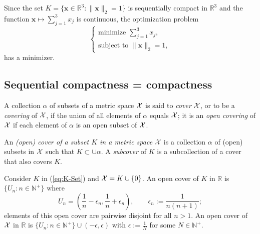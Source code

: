 \begin{exm}
  Since the set $K=\{\mathbf{x}\in \mathbb{R}^3: \|\mathbf{x}\|_2=1\}$
  is sequentially compact in $\mathbb{R}^3$ and the function
  $\mathbf{x}\mapsto \sum_{j=1}^3x_j$ is continuous,
  the optimization problem
  \begin{displaymath}
    \left\{
      \begin{array}{l}
        \text{minimize } \sum_{j=1}^3 x_j,
        \\
        \text{subject to } \|\mathbf{x}\|_2=1,
      \end{array}
    \right.
  \end{displaymath}
  has a minimizer.
\end{exm}

\subsection{Sequential compactness = compactness}
\label{sec:sequCompIsCompactness}

\begin{defn}
  A collection $\alpha$ of subsets of a metric space ${\cal X}$
   is said to \emph{cover} ${\cal X}$,
   or to be a \emph{covering} of ${\cal X}$,
   if the union of all elements of $\alpha$
   equals ${\cal X}$;
   it is an \emph{open covering} of ${\cal X}$
   if each element of $\alpha$ is an open subset of ${\cal X}$.
\end{defn}

\begin{defn}
  An \emph{(open) cover of a subset $K$ in a metric space} ${\cal X}$
   is a collection $\alpha$ of (open) subsets in ${\cal X}$
   such that $K \subset \cup \alpha$.
  A \emph{subcover} of $K$ is a subcollection of a cover
   that also covers $K$.
\end{defn}

\begin{exm}
  \label{exm:openCoverOfSubsets}
  Consider $K$ in (\ref{eq:K-Set})
   and ${\cal X}=K\cup\{0\}$.
  An open cover of $K$ in $\mathbb{R}$
   is $\{U_n: n\in \mathbb{N}^+\}$
   where
  \begin{displaymath}
    U_n=\left(\frac{1}{n}-\epsilon_n,
      \frac{1}{n}+\epsilon_n\right),\qquad
    \epsilon_n := \frac{1}{n(n+1)}; 
  \end{displaymath}
  elements of this open cover are pairwise disjoint
  for all $n>1$.
  An open cover of ${\cal X}$ in $\mathbb{R}$
   is $\{U_n: n\in \mathbb{N}^+\}\cup (-\epsilon, \epsilon)$
   with $\epsilon:= \frac{1}{N}$ for some $N\in \mathbb{N}^+$.
\end{exm}

